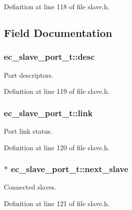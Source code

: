 \-Definition at line 118 of file slave.\-h.



\subsection{\-Field \-Documentation}
\subsubsection[{desc}]{ {\bf ec\-\_\-slave\-\_\-port\-\_\-t\-::desc}}\label{structec__slave__port__t_ae10a313d7421e3b4b7924c295075fc9c}


\-Port descriptors. 



\-Definition at line 119 of file slave.\-h.

\subsubsection[{link}]{ {\bf ec\-\_\-slave\-\_\-port\-\_\-t\-::link}}\label{structec__slave__port__t_ad29b2a093c816ae85986cf5fb9e9d6dd}


\-Port link status. 



\-Definition at line 120 of file slave.\-h.

\subsubsection[{next\-\_\-slave}]{$\ast$ {\bf ec\-\_\-slave\-\_\-port\-\_\-t\-::next\-\_\-slave}}\label{structec__slave__port__t_aa3ffc650817b6ca241bae9a9232f055d}


\-Connected slaves. 



\-Definition at line 121 of file slave.\-h.

